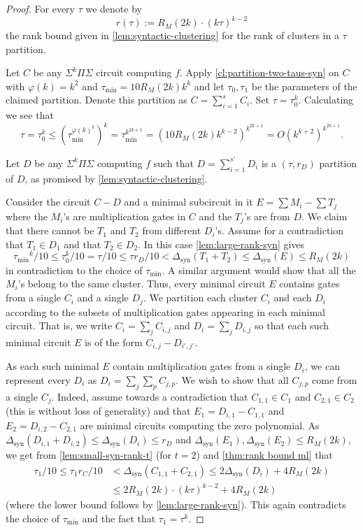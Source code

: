 \documentclass[12pt]{article}
\newcommand{\Sps}[1]{\Sigma^{#1} \Pi\Sigma}
\newcommand{\ranksyn}{\Delta_{\text{syn}}}
\begin{document}
	\begin{proof}
		For every $\tau$ we denote by
		\[
		r(\tau):= R_M(2k) \cdot  (k \tau)^{k-2}
		\] 
		the rank bound given in \autoref{lem:syntactic-clustering} for the rank of clusters in a $\tau$ partition. 
		
		Let $C$ be any $\Sps{k}$ circuit computing $f$.	
		Apply \autoref{cl:partition-two-taus-syn} on $C$ with $\varphi(k)=k^2$ and $\tau_\text{min}= 10 R_M(2k)k^{k}$ and  let $\tau_0,\tau_1$ be the parameters of the claimed partition. Denote this partition as $C=\sum_{i=1}^{s}C_i$.  Set $\tau=\tau_0^k$. 
		Calculating we see that 
		\[
		\tau=\tau_0^k \leq \left(\tau_\text{min}^{\varphi(k)^k}\right)^k=\tau_\text{min}^{k^{2k+1}}=( 10 R_M(2k)k^{k-2})^{k^{2k+1}}= O(k^{k+2})^{k^{2k+1}}.
		\]
		
		Let $D$ be any $\Sps{k}$ computing $f$ such that $D=\sum_{i=1}^{s'}D_i$ is a $(\tau,r_D)$ partition of $D$, as promised by \autoref{lem:syntactic-clustering}. 
		
		Consider the circuit $C-D$ and a minimal subcircuit in it $E=\sum M_i -\sum T_j$ where the $M_i$'s are multiplication gates in $C$ and the $T_j$'s are from $D$. We claim that there cannot be $T_1$ and $T_2$ from different $D_i$'s. Assume for a contradiction  that $T_1\in D_1$ and that $T_2\in D_2$.  In this case \autoref{lem:large-rank-syn} gives
		\[
		{\tau_\text{min}}^k/10\leq \tau_0^k/10=\tau/10\leq  \tau r_D/10 < \ranksyn(T_1+T_2)\leq \ranksyn(E) \leq R_M(2k)
		\]
		in contradiction to the choice of $\tau_\text{min}$. A similar argument would show that all the $M_i$'s belong to the same cluster. Thus, every minimal circuit $E$ contains gates from a single $C_i$ and a single $D_j$. 
		We partition each cluster $C_i$ and each $D_i$ according to the subsets of multiplication gates appearing in each minimal circuit. That is,
		we write $C_i=\sum_j C_{i,j}$ and $D_i=\sum_j D_{i,j}$ so that each such minimal circuit $E$ is of the form $C_{i,j}-D_{i',j'}$.
		
		As each such minimal $E$ contain multiplication gates from a single $D_i$, we can represent every $D_i$ as $D_i=\sum_j\sum_p C_{j,p}$. We wish to show that all $C_{j,p}$ come from a single $C_j$. Indeed, assume towards a contradiction that $C_{1,1}\in C_1$ and $C_{2,1}\in C_2$ (this is without loss of generality) and that $E_1=D_{i,1}-C_{1,1}$ and $E_2=D_{i,2}-C_{2,1}$ are minimal circuits computing the zero polynomial. As $\ranksyn(D_{i,1}+D_{i,2})\leq\ranksyn(D_i)\leq r_D$ and $\ranksyn(E_1),\ranksyn(E_2)\leq R_M(2k)$, we get from \autoref{lem:small-syn-rank-t} (for $t=2$) and  \autoref{thm:rank bound ml} that
		\begin{align}\label{eq:oneC}
			\tau_1/10\leq  \tau_1 r_C/10 &< \ranksyn(C_{1,1}+C_{2,1})\leq 2\ranksyn(D_i) + 4R_M(2k) \nonumber \\ &\leq  2 R_M(2k) \cdot  (k\tau)^{k-2}+ 4R_M(2k)
		\end{align}
		(where the lower bound follows by \autoref{lem:large-rank-syn}). This again contradicts the choice of $\tau_\text{min}$ and the fact that $\tau_1=\tau^k$. 
		

\end{proof}
\end{document}
